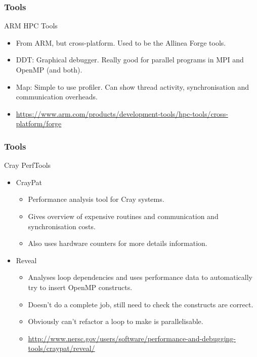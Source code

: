 \documentclass{beamer}
\begin{document}
\begin{frame}
\frametitle{Tools}
ARM HPC Tools
\begin{itemize}
  \item From ARM, but cross-platform. Used to be the Allinea Forge tools.
  \item DDT: Graphical debugger. Really good for parallel programs in MPI and OpenMP (and both).
  \item Map: Simple to use profiler. Can show thread activity, synchronisation and communication overheads.
  \item \url{https://www.arm.com/products/development-tools/hpc-tools/cross-platform/forge}
\end{itemize}
\end{frame}

\begin{frame}
\frametitle{Tools}
Cray PerfTools
\begin{itemize}
  \item CrayPat
    \begin{itemize}
      \item Performance analysis tool for Cray systems.
      \item Gives overview of expensive routines and communication and synchronisation costs.
      \item Also uses hardware counters for more details information.
    \end{itemize}
  \item Reveal
    \begin{itemize}
      \item Analyses loop dependencies and uses performance data to automatically try to insert OpenMP constructs.
      \item Doesn't do a complete job, still need to check the constructs are correct.
      \item Obviously can't refactor a loop to make is parallelisable.
      \item \url{http://www.nersc.gov/users/software/performance-and-debugging-tools/craypat/reveal/}
    \end{itemize}
\end{itemize}
\end{frame}
\end{document}
